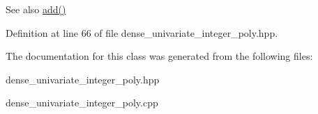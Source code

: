 \begin{DoxySeeAlso}{See also}
\hyperlink{class_dense___univariate___integer___polynomial_a9aed4c0d2f30a93f79a11f8ab102601f}{add()} 
\end{DoxySeeAlso}


Definition at line 66 of file dense\+\_\+univariate\+\_\+integer\+\_\+poly.\+hpp.



The documentation for this class was generated from the following files\+:\begin{DoxyCompactItemize}
\item 
dense\+\_\+univariate\+\_\+integer\+\_\+poly.\+hpp\item 
dense\+\_\+univariate\+\_\+integer\+\_\+poly.\+cpp\end{DoxyCompactItemize}
